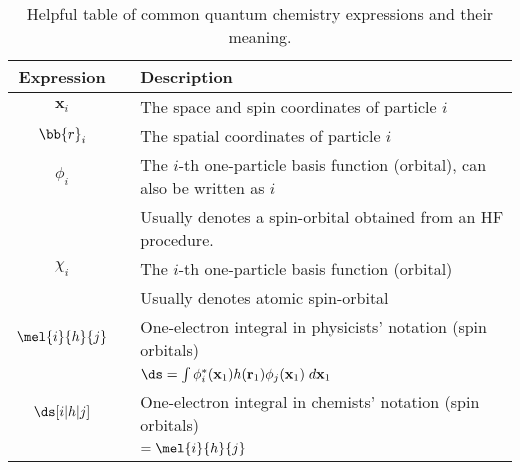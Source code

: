 \documentclass[11pt]{article}
\begin{document}
\begin{table}[H]
    \caption{Helpful table of common quantum chemistry expressions and their meaning.}
	\begin{tabular}{ccl}
		\toprule
		      Expression       &     & Description                                                                                                                                 \\
		\midrule
		    $\mathbf{x}_i$     &     & The space and spin coordinates of particle $i$                                                                                              \\
		      $\bb{r}_i$       &     & The spatial coordinates of particle $i$                                                                                                     \\
		       $\phi_i$        &     & The $i$-th one-particle basis function (orbital), can also be written as $i$                                                                \\
		                       &     & Usually denotes a spin-orbital obtained from an HF procedure.                                                                               \\
		       $\chi_i$        &     & The $i$-th one-particle basis function (orbital)                                                                                            \\
		                       &     & Usually denotes atomic spin-orbital                                                                                                         \\
		  $\mel{i}{h}{j}$      &     & One-electron integral in physicists' notation (spin orbitals)                                                                               \\
		                       &     & $\ds =\int\phi_i^*(\mathbf{x}_1) h(\mathbf{r}_1)\phi_j (\mathbf{x}_1) \; d\mathbf{x}_1$                                                     \\
		    $\ds [i|h|j] $     &     & One-electron integral in chemists' notation (spin orbitals)                                                                                 \\
		                       &     & $ = \mel{i}{h}{j}$                                                                                                                          \\

\end{tabular}
\end{table}
\end{document}
